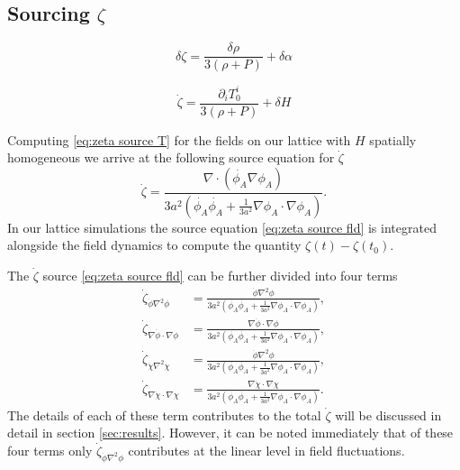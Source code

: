 \subsection{Sourcing $\zeta$}


\begin{equation} \label{eq:zeta differential}
  \delta\zeta = \frac{\delta\rho}{3(\rho + P)} + \delta\alpha
\end{equation} 

\begin{equation} \label{eq:zeta source T}
  \dot{\zeta} = \frac{\partial_iT^i_0}{3(\rho+P)} + \delta H %
\end{equation} 

Computing \eqref{eq:zeta source T} for the fields on our lattice with $H$ spatially homogeneous we arrive at the following source equation for $\dot{\zeta}$
\begin{equation} \label{eq:zeta source fld}
  \dot{\zeta} = \frac{\nabla\cdot(\dot{\phi_A}\nabla\phi_A)}{3a^2(\dot{\phi_A}\dot{\phi_A} +\frac{1}{3a^2}\nabla\phi_A\cdot\nabla\phi_A)}.
\end{equation} 
In our lattice simulations the source equation \eqref{eq:zeta source fld} is integrated alongside the field dynamics to compute the quantity $\zeta(t) - \zeta(t_0)$. 

The $\dot{\zeta}$ source \eqref{eq:zeta source fld} can be further divided into four terms
\begin{align}
  \dot{\zeta}_{\dot{\phi}\nabla^2\phi} & = \frac{\dot{\phi}\nabla^2\phi}{3a^2(\dot{\phi_A}\dot{\phi_A} +\frac{1}{3a^2}\nabla\phi_A\cdot\nabla\phi_A)}, \\
  \dot{\zeta}_{\nabla\dot{\phi}\cdot\nabla\phi} & = \frac{\nabla\dot{\phi}\cdot\nabla\phi}{3a^2(\dot{\phi_A}\dot{\phi_A} +\frac{1}{3a^2}\nabla\phi_A\cdot\nabla\phi_A)}, \\
  \dot{\zeta}_{\dot{\chi}\nabla^2\chi} & = \frac{\dot{\phi}\nabla^2\phi}{3a^2(\dot{\phi_A}\dot{\phi_A} +\frac{1}{3a^2}\nabla\phi_A\cdot\nabla\phi_A)}, \\
  \dot{\zeta}_{\nabla\dot{\chi}\cdot\nabla\chi} & = \frac{\nabla\dot{\chi}\cdot\nabla\chi}{3a^2(\dot{\phi_A}\dot{\phi_A} +\frac{1}{3a^2}\nabla\phi_A\cdot\nabla\phi_A)}.
\end{align}
The details of each of these term contributes to the total $\dot{\zeta}$ will be discussed in detail in section \ref{sec:results}.
However, it can be noted immediately that of these four terms only $\dot{\zeta}_{\dot{\phi}\nabla^2\phi}$ contributes at the linear level in field fluctuations. %

